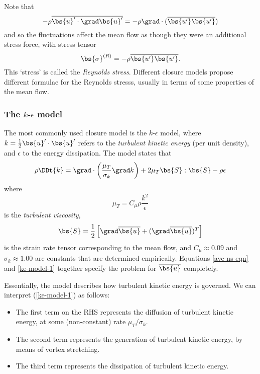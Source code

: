 Note that 
\begin{equation}
    -\rho\overline{\bs{u}'\cdot\grad\bs{u}'} = -\rho\grad\cdot(\overline{\bs{u'}\bs{u'}})
\end{equation}
and so the fluctuations affect the mean flow as though they were an additional
stress force, with stress tensor 
\begin{equation}
    \bs{\sigma}^{(R)} = -\rho \overline{\bs{u'}\bs{u'}}.
\end{equation}
This `stress' is called the \textit{Reynolds stress}. Different closure models propose different formulae for the Reynolds stresss, usually in terms of some properties of the mean flow. 

\subsubsection{The $k$-$\epsilon$ model}

The most commonly used closure model is the $k$-$\epsilon$ model, where
$k=\frac{1}{2}\bs{u}'\cdot\bs{u}'$ refers to the \textit{turbulent kinetic energy} (per
unit density), and $\epsilon$ to the energy dissipation. The model states that
\begin{equation}
    \rho\DDt{k}
    = \grad\cdot\left(\frac{\mu_T}{\sigma_k}\grad k\right) 
    + 2 \mu_T \bs{S}:\bs{S} 
    - \rho\epsilon
    \label{ke-model-1}
\end{equation}
where 
\begin{equation}
    \mu_T = C_\mu\rho\frac{k^2}{\epsilon}
\end{equation}
is the \textit{turbulent viscosity}, 
\begin{equation}
    \bs{S} = \frac{1}{2}\left[\grad\overline{\bs{u}} + (\grad\overline{\bs{u}})^T\right]
\end{equation}
is the strain rate tensor corresponding to the mean flow, and $C_\mu \approx
0.09$ and $\sigma_k\approx1.00$ are constants that are determined empirically.
Equations \ref{ave-ns-eqn} and \ref{ke-model-1} together specify the problem for
$\overline{\bs{u}}$ completely.

Essentially, the model describes how turbulent kinetic energy is governed. We
can interpret (\ref{ke-model-1}) as follows:
\begin{itemize}
    \item The first term on the RHS represents the diffusion of turbulent
        kinetic energy, at some (non-constant) rate $\mu_T/\sigma_k$.
    \item The second term represents the generation of turbulent kinetic energy,
        by means of vortex stretching.
    \item The third term represents the dissipation of turbulent kinetic energy.
\end{itemize}

